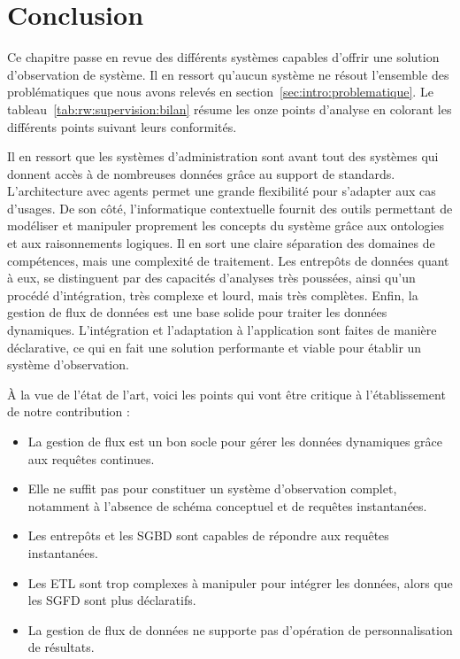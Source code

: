 \section{Conclusion}
Ce chapitre passe en revue des différents systèmes capables d'offrir une solution d'observation de système. Il en ressort qu'aucun système ne résout l'ensemble des problématiques que nous avons relevés en section~\ref{sec:intro:problematique}. Le tableau~\ref{tab:rw:supervision:bilan} résume les onze points d'analyse en colorant les différents points suivant leurs conformités. 

Il en ressort que les systèmes d'administration sont avant tout des systèmes qui donnent accès à de nombreuses données grâce au support de standards. L'architecture avec agents permet une grande flexibilité pour s'adapter aux cas d'usages. De son côté, l'informatique contextuelle fournit des outils permettant de modéliser et manipuler proprement les concepts du système grâce aux ontologies et aux raisonnements logiques. Il en sort une claire séparation des domaines de compétences, mais une complexité de traitement. Les entrepôts de données quant à eux, se distinguent par des capacités d'analyses très poussées, ainsi qu'un procédé d'intégration, très complexe et lourd, mais très complètes. Enfin, la gestion de flux de données est une base solide pour traiter les données dynamiques. L'intégration et l'adaptation à l'application sont faites de manière déclarative, ce qui en fait une solution performante et viable pour établir un système d'observation.

À la vue de l'état de l'art, voici les points qui vont être critique à l'établissement de notre contribution :
\begin{itemize}
    \item La gestion de flux est un bon socle pour gérer les données dynamiques grâce aux requêtes continues.
    \item Elle ne suffit pas pour constituer un système d'observation complet, notamment à l'absence de schéma conceptuel et de requêtes instantanées.
    \item Les entrepôts et les SGBD sont capables de répondre aux requêtes instantanées.
    \item Les ETL sont trop complexes à manipuler pour intégrer les données, alors que les SGFD sont plus déclaratifs.
    \item La gestion de flux de données ne supporte pas d'opération de personnalisation de résultats.
\end{itemize}

